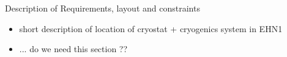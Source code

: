Description of Requirements, layout and constraints

\begin{itemize}
\item short description of location of cryostat + cryogenics system in EHN1
\item ... do we need this section ??

\end{itemize}
